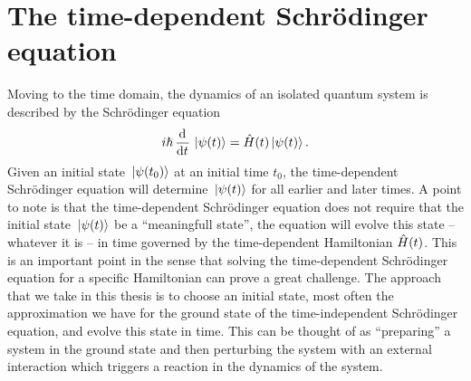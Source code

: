     \section{The time-dependent Schrödinger equation}
        Moving to the time domain, the dynamics of an isolated quantum system is
        described by the Schrödinger equation
        \begin{align}
            i\hslash \dod{}{t}\ket*{\psi(t)}
            = \hamil(t)\ket*{\psi(t)}.
            \label{eq:tdse}
        \end{align}
        Given an initial state $\ket*{\psi(t_0)}$ at an initial time $t_0$, the
        time-dependent Schrödinger equation will determine $\ket*{\psi(t)}$ for
        all earlier and later times.
        A point to note is that the time-dependent Schrödinger equation does not
        require that the initial state $\ket*{\psi(t)}$ be a ``meaningfull
        state'', the equation will evolve this state -- whatever it is -- in
        time governed by the time-dependent Hamiltonian $\hat{H}(t)$.
        This is an important point in the sense that solving the time-dependent
        Schrödinger equation for a specific Hamiltonian can prove a great
        challenge.
        The approach that we take in this thesis is to choose an initial state,
        most often the approximation we have for the ground state of the
        time-independent Schrödinger equation, and evolve this state in time.
        This can be thought of as ``preparing'' a system in the ground state and
        then perturbing the system with an external interaction which triggers a
        reaction in the dynamics of the system.

